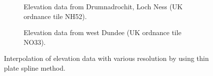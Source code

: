 \documentclass[a4paper,10pt]{report}
\begin{document}
\begin{figure}[H]
    \centering
    \begin{subfigure}{\textwidth}
        
    \caption{Elevation data from Drumnadrochit, Loch Ness (UK ordnance tile NH52).}
    \end{subfigure}
    \begin{subfigure}{\textwidth}
        
    \caption{Elevation data from west Dundee (UK ordnance tile NO33).}
    \end{subfigure}
    \caption{Interpolation of elevation data with various resolution by using thin plate spline method.}
    \label{fig:2D_data}
\end{figure}
\end{document}
